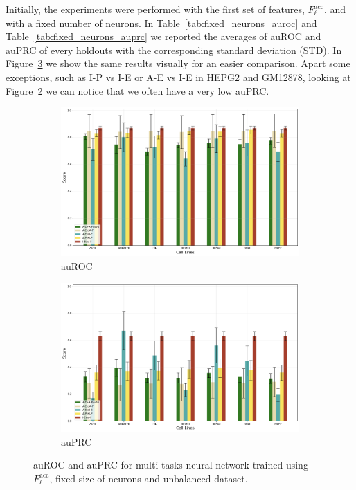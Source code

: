 Initially, the experiments were performed with the first set of features, $F_\ell^{\textrm{acc}}$, and with a fixed number of neurons. In Table~\ref{tab:fixed_neurons_auroc} and Table~\ref{tab:fixed_neurons_auprc} we reported the averages of auROC and auPRC of every holdouts with the corresponding standard deviation (STD). In Figure~\ref{fig:fixed_neurons_results} we show the same results visually for an easier comparison. Apart some exceptions, such as I-P vs I-E or A-E vs I-E in HEPG2 and GM12878, looking at Figure~\ref{fig:auprc_fixed_neurons} we can notice that we often have a very low auPRC. 
\begin{figure}[!htbp]
    \centering
    \begin{subfigure}[b]{\textwidth}
        \includegraphics[width=\textwidth]{images/results_plots/fixed_neurons_auroc.png}
        \caption{auROC}
        \label{fig:auroc_fixed_neurons}
    \end{subfigure}
    \begin{subfigure}[b]{\textwidth}
        \includegraphics[width=\textwidth]{images/results_plots/fixed_neurons_auprc.png}
        \caption{auPRC}
        \label{fig:auprc_fixed_neurons}
    \end{subfigure}
    \caption{auROC and auPRC for multi-tasks neural network trained using $F_\ell^{\textrm{acc}}$, fixed size of neurons and unbalanced dataset.}
    \label{fig:fixed_neurons_results}
\end{figure}

